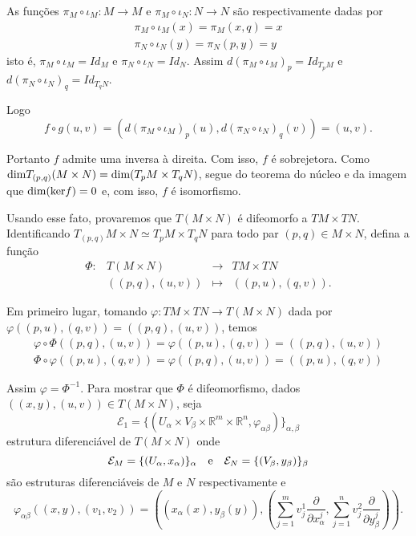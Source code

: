 \documentclass[twoside,openright,titlepage,numbers=noenddot,headinclude,  lineheaders footinclude=true,cleardoublepage=empty,BCOR=5mm,paper=a4,fontsize=12pt ]{scrbook}
\newcommand{\R}{\mathbb R}
\begin{document}
As funções $\pi_M \circ \iota_M: M \longrightarrow M$ e $\pi_M \circ \iota_N: N \longrightarrow N$ são respectivamente dadas por 
\begin{eqnarray*}
    \pi_M \circ \iota_M(x) = \pi_M(x,q) = x\\
    \pi_N \circ \iota_N(y) = \pi_N(p,y) = y
\end{eqnarray*}
isto é, $\pi_M \circ \iota_M = Id_M$ e $\pi_N \circ \iota_N = Id_N$. Assim $d(\pi_M \circ \iota_M)_p = Id_{T_pM}$ e $d(\pi_N \circ \iota_N)_q = Id_{T_q N}$.

Logo
\begin{equation*}
    f \circ g(u,v) = \left(d(\pi_M \circ \iota_M)_p(u), d(\pi_N \circ \iota_N)_q(v)\right) = (u,v).
\end{equation*}

Portanto $f$ admite uma inversa à direita. Com isso, $f$ é sobrejetora. Como $\hbox{dim}T_{(p,q)} (M \times N) = \hbox{dim}(T_pM \times T_q N)$, segue do teorema do núcleo e da imagem que $\hbox{dim}(\hbox{ker}f) = 0$ e, com isso, $f$ é isomorfismo. 

Usando esse fato, provaremos que $T (M \times N)$ é difeomorfo a $TM \times TN$. Identificando $T_{(p,q)} M \times N \simeq T_p M \times T_q N$ para todo par $(p,q) \in M \times N$, defina a função 
\begin{equation*}
    \begin{array}{cccc}
        \Phi:& T (M \times N) &\longrightarrow & TM \times TN\\
            &((p,q),(u,v)) & \mapsto & ((p,u),(q,v)).
    \end{array}
\end{equation*}

 Em primeiro lugar, tomando $\varphi: TM \times TN \longrightarrow T (M\times N)$ dada por $\varphi((p,u),(q,v)) = ((p,q),(u,v))$, temos 
 \begin{eqnarray*}
     \varphi \circ \Phi((p,q),(u,v)) = \varphi((p,u),(q,v)) = ((p,q),(u,v))\\
     \Phi \circ \varphi((p,u),(q,v)) = \varphi((p,q),(u,v)) = ((p,u),(q,v))
 \end{eqnarray*}
 
Assim $\varphi = \Phi^{-1}$. Para mostrar que $\Phi$ é difeomorfismo, dados $((x,y),(u,v)) \in T(M \times N)$, seja 
\begin{equation*}
     \mathcal{E}_1 = \{(U_{\alpha} \times V_{\beta} \times \R^m \times \R^n, \varphi_{\alpha \beta})\}_{\alpha, \beta}
\end{equation*}
estrutura diferenciável de $T (M \times N)$ onde 
\begin{equation*}
    \mathcal{E}_M = \{(U_{\alpha},x_{\alpha})\}_{\alpha} \ \ \hbox{ e } \ \  \mathcal{E}_N = \{(V_{\beta},y_{\beta})\}_{\beta}
\end{equation*}
são estruturas diferenciáveis de $M$ e $N$ respectivamente e 
\begin{equation*}
    \varphi_{\alpha \beta}((x,y),(v_1,v_2)) = \left((x_{\alpha}(x),y_{\beta}(y)), \left(\sum_{j=1}^m v_j^1 \frac{\partial}{\partial x_{\alpha}^j},\sum_{j=1}^n v_j^2 \frac{\partial}{\partial y_{\beta}^j}\right)\right) .
\end{equation*}
\end{document}
